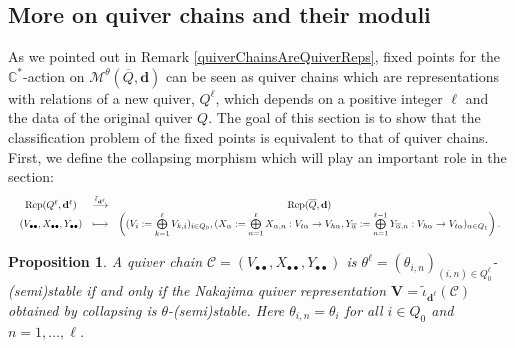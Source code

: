 \documentclass{amsart}
\theoremstyle{plain}
\newtheorem{proposition}[theorem]{Proposition}
\numberwithin{equation}{section}
\theoremstyle{definition}
\theoremstyle{remark}
\begin{document}
	\subsection{More on quiver chains and their moduli}\label{quiverChainsSection}
	As we pointed out in Remark \ref{quiverChainsAreQuiverReps}, fixed points for the $\mathbb{C}^*$-action on $\mathcal{M}^{\theta}(\overline{Q},\mathbf{d})$ can be seen as quiver chains which are representations with relations of a new quiver, $Q^\ell$, which depends on a positive integer $\ell$ and the data of the original quiver $Q$. The goal of this section is to show that the classification problem of the fixed points is equivalent to that of quiver chains. First, we define the collapsing morphism which will play an important role in the section:
	$$
	\resizebox{\textwidth}{!}{$
	\begin{matrix}
	\operatorname{Rep}(Q^\ell,\mathbf{d}^\ell)&\overset{\tilde{\iota}_{\mathbf{d}^\ell}}{\longrightarrow}&\operatorname{Rep}(\overline{Q},\mathbf{d}) \\
		(V_{\bullet\bullet},X_{\bullet\bullet},Y_{\bullet\bullet}) & \longmapsto& \left ((V_i:=\bigoplus\limits_{k=1}^\ell V_{k,i})_{i\in Q_0},(X_\alpha:=\bigoplus\limits_{n=1}^{\ell}X_{\alpha,n}:V_{t\alpha}\to V_{h\alpha},Y_{\overline\alpha}:=
		\bigoplus\limits_{n=1}^{\ell-1}Y_{\overline\alpha,n}:V_{h\alpha}\rightarrow V_{t\alpha})_{\alpha\in Q_1}\right). 
	\end{matrix} $}
	$$
	\begin{proposition}\label{semistableRepresentationIffSemistableChain}
		A quiver chain $\mathcal{C}=(V_{\bullet\bullet},X_{\bullet\bullet},Y_{\bullet\bullet})$ is $\theta^{\ell}=(\theta_{i,n})_{(i,n)\in Q_0^\ell}$-(semi)stable if and only if the Nakajima quiver representation $\mathbf{V}=\tilde{\iota}_{\mathbf{d}^\ell}(\mathcal{C})$ obtained by collapsing is $\theta$-(semi)stable. Here $\theta_{i,n}=\theta_i$ for all $i\in Q_0$ and $n=1,\ldots,\ell$.
	\end{proposition}
\end{document}
